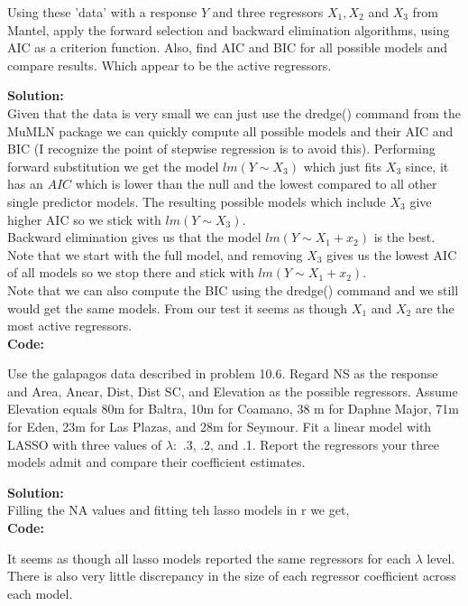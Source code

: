 \documentclass[12pt]{article}
\makeatletter
\theoremstyle{homework}
\newenvironment{exercise}[1]
{\def\@currentlabel{#1}\exercisecore}
{\endexercisecore}
\newcommand{\localhead}[1]{\par\smallskip\noindent\textbf{#1}\nobreak\\}%
\newcommand\solution{\localhead{Solution:}}
\makeatother
\begin{document}
\begin{exercise}{2} Using these 'data' with a response $Y$ and three regressors $X_1, X_2$ and $X_3$ from Mantel, apply the forward 
  selection and backward elimination algorithms, using AIC as a criterion function. Also, find AIC and BIC for all possible models and compare results. Which appear 
  to be the active regressors. \\
  \solution Given that the data is very small we can just use the dredge() command from the MuMLN package we can quickly compute all possible models and their AIC and BIC (I recognize the 
  point of stepwise regression is to avoid this). Performing forward substitution we get the model $lm(Y\sim X_3)$ which just fits $X_3$ since, it has an $AIC$ which is lower than the null and the lowest 
  compared to all other single predictor models. The resulting possible models which include $X_3$ give higher AIC so we stick with $lm(Y\sim X_3)$.\\

  Backward elimination gives us that the model $lm(Y\sim X_1 + x_2)$ is the best. Note that we start with the full model, and removing $X_3$ gives us the lowest AIC of all models so we stop there and stick with 
  $lm(Y \sim X_1 + x_2)$. \\

  Note that we can also compute the BIC using the dredge() command and we still would get the same models. From our test it seems as though $X_1$ and $X_2$ are the most active regressors. \\ 

 \textbf{Code:}
 \begin{center}
 
 \end{center} 
\end{exercise}




\newpage


\begin{exercise}{3} Use the galapagos data described in problem 10.6. Regard NS as the response and Area, Anear, Dist, Dist SC, and 
  Elevation as the possible regressors. Assume Elevation equals 80m for Baltra, 10m for Coamano, 38 m for Daphne Major, 71m for Eden, 23m for Las Plazas, and 28m for Seymour. Fit 
  a linear model with LASSO with three values of $\lambda:$ .3, .2, and .1. Report the regressors your three models admit and compare their coefficient estimates. \\
  \solution Filling the NA values and fitting teh lasso models in r we get, \\
 \textbf{Code:}
 \begin{center}
 
 \end{center} 
  It seems as though all lasso models reported the same regressors for each $\lambda$ level. There is also very little discrepancy in the size of each 
  regressor coefficient across each model. 
\end{exercise}
\end{document}
